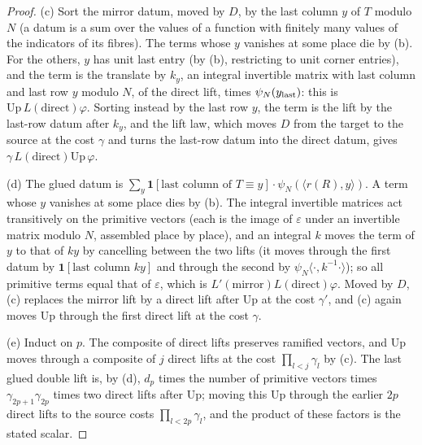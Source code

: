 \begin{proof}
(c) Sort the mirror datum, moved by $D$, by the last column $y$ of $T$ modulo $N$ (a datum is a sum over the values of a function with finitely many values of the indicators of its fibres). The terms whose $y$ vanishes at some place die by (b). For the others, $y$ has unit last entry (by (b), restricting to unit corner entries), and the term is the translate by
$k_y$, an integral invertible matrix with last column and last row $y$ modulo $N$, of the direct lift, times $\psi_N(y_{\rm last})$: this is $\mathrm{Up}\,L(\text{direct})\varphi$. Sorting instead by the last row $y$, the term is the lift by the last-row datum after $k_y$, and the lift law, which moves $D$ from the target to the source at the cost $\gamma$
and turns the last-row datum into the direct datum, gives $\gamma\,L(\text{direct})\mathrm{Up}\,\varphi$.

(d) The glued datum is $\sum_y\mathbf1[\text{last column of }T\equiv y]\cdot\psi_N(\langle r(R),y\rangle)$. A term whose $y$ vanishes at some place dies by (b). The integral invertible matrices act transitively on the primitive vectors (each is the image of $\varepsilon$ under an invertible matrix modulo $N$, assembled place by place), and an integral $k$
moves the term of $y$ to that of $ky$ by cancelling between the two lifts (it moves through the first datum by $\mathbf1[\text{last column }ky]$ and through the second by $\psi_N\langle\cdot,k^{-1}\cdot\rangle$); so all primitive terms equal that of $\varepsilon$, which is $L'(\text{mirror})L(\text{direct})\varphi$. Moved by $D$, (c) replaces the mirror lift by a direct lift
after $\mathrm{Up}$ at the cost $\gamma'$, and (c) again moves $\mathrm{Up}$ through the first direct lift at the cost $\gamma$.

(e) Induct on $p$. The composite of direct lifts preserves ramified vectors, and $\mathrm{Up}$ moves through a composite of $j$ direct lifts at the cost $\prod_{l<j}\gamma_l$ by (c). The last glued double lift is, by (d), $d_p$ times the number of primitive vectors times $\gamma_{2p+1}\gamma_{2p}$ times two direct lifts after $\mathrm{Up}$; moving
this $\mathrm{Up}$ through the earlier $2p$ direct lifts to the source costs $\prod_{l<2p}\gamma_l$, and the product of these factors is the stated scalar.
\end{proof}

